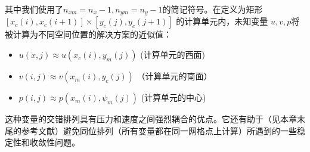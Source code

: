\documentclass[UTF8]{ctexart}
\begin{document}
\indent 其中我们使用了$n_{x m}=n_x-1, n_{y m}=n_y-1$的简记符号。在定义为矩形$[x_c(i), x_c(i+1)] \times [y_c(j), y_c(j+1)]$ 的计算单元内，未知变量 $u, v, p$将被计算为不同空间位置的解决方案的近似值：
\begin{itemize}
    \item $u(\dot{x}, j) \approx u\left(x_c(i), y_m(j)\right)$ (计算单元的西面)
    \item $v(i, j)\approx v\left(x_m(i), y_c(j)\right)$ （计算单元的南面）
    \item $p(i, j)\approx p\left(x_m(i), \psi_m(j)\right)$ (计算单元的中心)
\end{itemize}
\par 这种变量的交错排列具有压力和速度之间强烈耦合的优点。它还有助于（见本章末尾的参考文献\cite{thebook}）避免同位排列（所有变量都在同一网格点上计算）所遇到的一些稳定性和收敛性问题。



\end{document}
